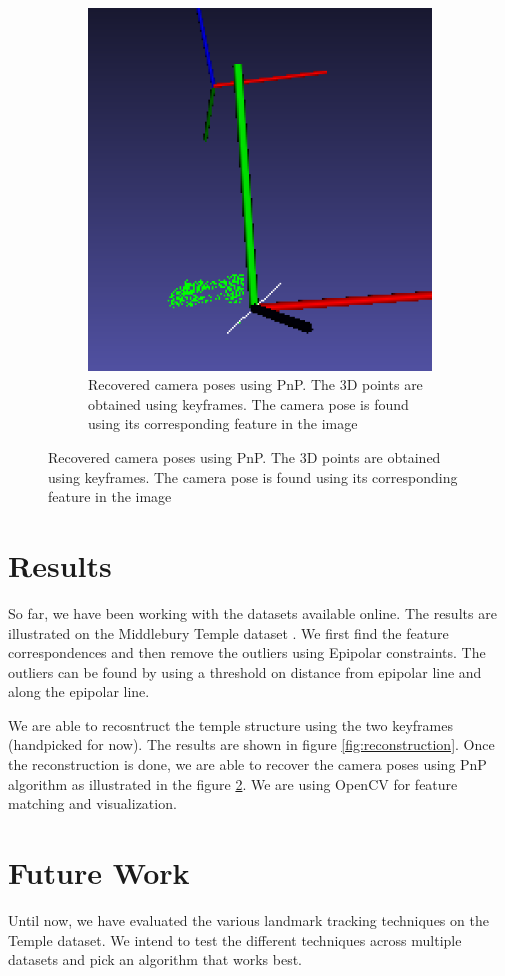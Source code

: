 \documentclass[12pt,twocolumn,letterpaper]{article}
\begin{document}
\begin{figure}
\begin{subfigure}{.3\textwidth}
        \includegraphics[width=.7\textwidth]{images/camera_pose}
        \caption{Recovered camera poses using PnP. The 3D points are obtained using keyframes. The camera pose is found using its corresponding feature in the image}
        \label{fig:pose}
    \end{subfigure}
\end{figure}



\section{Results}
So far, we have been working with the datasets available online. The results are illustrated on the Middlebury Temple dataset \cite{middlebury}. We first find the feature correspondences and then remove the outliers using Epipolar constraints. The outliers can be found by using a threshold on distance from epipolar line and along the epipolar line.

We are able to recosntruct the temple structure using the two keyframes (handpicked for now). The results are shown in figure \ref{fig:reconstruction}. Once the reconstruction is done, we are able to recover the camera poses using PnP algorithm as illustrated in the figure \ref{fig:pose}. We are using OpenCV for feature matching and visualization.


\section{Future Work}
Until now, we have evaluated the various landmark tracking techniques on the Temple dataset. We intend to test the different techniques across multiple datasets and pick an algorithm that works best.
\end{document}
